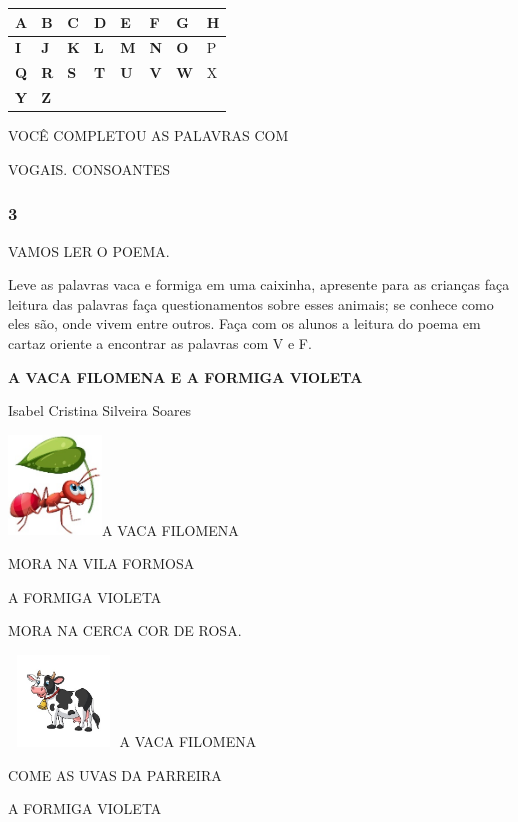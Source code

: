 \begin{longtable}[]{@{}llllllll@{}}
\toprule
\textbf{A } & \textbf{B} & \textbf{C} & \textbf{D} & \textbf{E} &
\textbf{F} & \textbf{G} & H\tabularnewline
\midrule
\endhead
\textbf{I} & \textbf{J} & \textbf{K} & \textbf{L} & \textbf{M} &
\textbf{N} & \textbf{O} & P\tabularnewline
\textbf{Q} & \textbf{R} & \textbf{S} & \textbf{T} & \textbf{U} &
\textbf{V} & \textbf{W} & X\tabularnewline
\textbf{Y} & \textbf{Z}\tabularnewline
\bottomrule
\end{longtable}

VOCÊ COMPLETOU AS PALAVRAS COM

VOGAIS. CONSOANTES

\subsubsection{3}\label{section-2}

VAMOS LER O POEMA.

Leve as palavras vaca e formiga em uma caixinha, apresente para as
crianças faça leitura das palavras faça questionamentos sobre esses
animais; se conhece como eles são, onde vivem entre outros. Faça com os
alunos a leitura do poema em cartaz oriente a encontrar as palavras com
V e F.

\textbf{A VACA FILOMENA E A FORMIGA VIOLETA}

Isabel Cristina Silveira Soares

\includegraphics[width=0.97986in,height=1.05208in]{media/image5.jpeg}A
VACA FILOMENA

MORA NA VILA FORMOSA

A FORMIGA VIOLETA

MORA NA CERCA COR DE ROSA.

\includegraphics[width=1.16127in,height=0.95833in]{media/image6.jpeg}A
VACA FILOMENA

COME AS UVAS DA PARREIRA

A FORMIGA VIOLETA

